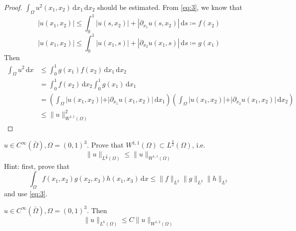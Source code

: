 \documentclass{report}
\begin{document}
\begin{proof}
    \(\int_{\Omega} u^{2}(x_1, x_2) \,\mathrm{d}x_1 \,\mathrm{d}x_2\) should be estimated. From \ref{eq:3}, we know that 
    \[\vert u(x_1, x_2) \vert \leq \int_{0}^{1} \vert u(s, x_2) \vert + |\partial_{x_1} u(s, x_2)| \,\mathrm{d}s \coloneqq f(x_2)\]
    \[\vert u(x_1, x_2) \vert \leq \int_{0}^{1} \vert u(x_1, s) \vert + |\partial_{x_2} u(x_1, s)| \,\mathrm{d}s \coloneqq g(x_1)\]
    Then 
    \begin{align*}
        \int_{\Omega} u^2 \,\mathrm{d}x &\leq \int_{0}^{1} g(x_1)f(x_2) \,\mathrm{d}x_1 \,\mathrm{d}x_2 \\
        &= \int_{0}^{1} f(x_2) \,\mathrm{d}x_2 \int_{0}^{1} g(x_1) \,\mathrm{d}x_1 \\
        &= \left(\int_{\Omega} \vert u(x_1, x_2) \vert + \vert \partial_{x_1} u(x_1, x_2) \vert \,\mathrm{d}x_1 \right) \left(\int_{\Omega} \vert u(x_1, x_2) \vert + \vert \partial_{x_2} u(x_1, x_2) \vert \,\mathrm{d}x_2 \right) \\
        &\leq \|u\|_{W^{1, 1}(\Omega)}^{2}
    \end{align*}
\end{proof}

{
    \(u \in C^{\infty}(\bar{\Omega}), \Omega = (0,1)^3\). Prove that \(W^{1, 1}(\Omega) \subset L^{\frac{3}{2}}(\Omega)\), i.e.
    \begin{equation}\label{eq:4}
        \|u\|_{L^{\frac{3}{2}}(\Omega)} \leq \|u\|_{W^{1, 1}(\Omega)}
    \end{equation}
    Hint: first, prove that
    \[\int_{\Omega} f(x_1, x_2)g(x_2, x_3)h(x_1, x_3) \,\mathrm{d}x \leq \|f\|_{L^{2}} \|g\|_{L^{2}} \|h\|_{L^{2}}\]
    and use \ref{eq:3}.
}

\begin{example}{}{}
    \(u \in C^{\infty}(\bar{\Omega}), \Omega = (0,1)^3\). Then 
    \begin{equation}
        \|u\|_{L^{6}(\Omega)} \leq C \|u\|_{W^{1, 2}(\Omega)}
    \end{equation}
\end{example} 
\end{document}
